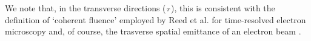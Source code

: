 We note that, in the transverse directions (${\scriptscriptstyle T}$), this is consistent with the definition of `coherent fluence' employed by Reed et al.\cite{reed_evolution_2009} for time-resolved electron microscopy and, of course, the trasverse spatial emittance of an electron beam \cite{jensen_theoretical_2006,siwick_ultrafast_2002}.

